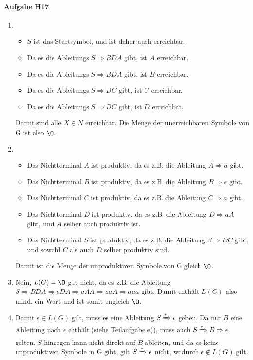 \documentclass[11pt]{article}
\begin{document}
\paragraph{Aufgabe H17}
\begin{enumerate}[label=\alph*)]
\item \begin{itemize}
\item $S$ ist das Startsymbol, und ist daher auch erreichbar.
\item Da es die Ableitungs $S\Rightarrow BDA$ gibt, ist $A$ erreichbar.
\item Da es die Ableitungs $S\Rightarrow BDA$ gibt, ist $B$ erreichbar.
\item Da es die Ableitungs $S\Rightarrow DC$ gibt, ist $C$ erreichbar.
\item Da es die Ableitungs $S\Rightarrow DC$ gibt, ist $D$ erreichbar.
\end{itemize}
Damit sind alle $X\in N$ erreichbar. Die Menge der unerreichbaren Symbole von G ist also $\O$.
\item \begin{itemize}
\item Das Nichtterminal $A$ ist produktiv, da es z.B. die Ableitung $A\Rightarrow a$ gibt.
\item Das Nichtterminal $B$ ist produktiv, da es z.B. die Ableitung $B\Rightarrow \epsilon$ gibt.
\item Das Nichtterminal $C$ ist produktiv, da es z.B. die Ableitung $C\Rightarrow a$ gibt.
\item Das Nichtterminal $D$ ist produktiv, da es z.B. die Ableitung $D\Rightarrow aA$ gibt, und $A$ selber auch produktiv ist.
\item Das Nichtterminal $S$ ist produktiv, da es z.B. die Ableitung $S\Rightarrow DC$ gibt, und sowohl $C$ als auch $D$ selber produktiv sind.
\end{itemize}
Damit ist die Menge der unproduktiven Symbole von G gleich $\O$.
\item Nein, $L(G)=\O$ gilt nicht, da es z.B. die Ableitung $S\Rightarrow BDA\Rightarrow \epsilon DA\Rightarrow aAA\Rightarrow aaA \Rightarrow aaa$ gibt. Damit enthält $L(G)$ also mind. ein Wort und ist somit ungleich $\O$.
\item Damit $\epsilon\in L(G)$ gilt, muss es eine Ableitung $S\xRightarrow[]{*}\epsilon$ geben. Da nur $B$ eine Ableitung nach $\epsilon$ enthält (siehe Teilaufgabe e)), muss auch $S\xRightarrow[]{*} B\Rightarrow\epsilon$ gelten. $S$ hingegen kann nicht direkt auf $B$ ableiten, und da es keine unproduktiven Symbole in G gibt, gilt $S\xRightarrow[]{*}\epsilon$ nicht, wodurch $\epsilon\not\in L(G)$ gilt.

\end{enumerate}
\end{document}
